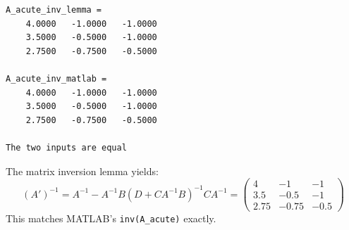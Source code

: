 \documentclass[12pt]{article}
\begin{document}
\begin{outputbox}
\begin{lstlisting}[style=output]
A_acute_inv_lemma =
    4.0000   -1.0000   -1.0000
    3.5000   -0.5000   -1.0000
    2.7500   -0.7500   -0.5000

A_acute_inv_matlab =
    4.0000   -1.0000   -1.0000
    3.5000   -0.5000   -1.0000
    2.7500   -0.7500   -0.5000

The two inputs are equal
\end{lstlisting}
\end{outputbox}

\begin{resultsbox}
The matrix inversion lemma yields:
\[
(A')^{-1} = A^{-1} - A^{-1}B(D + CA^{-1}B)^{-1}CA^{-1} = \begin{pmatrix} 4 & -1 & -1 \\ 3.5 & -0.5 & -1 \\ 2.75 & -0.75 & -0.5 \end{pmatrix}
\]
This matches MATLAB's \texttt{inv(A\_acute)} exactly. \quad \checkmark
\end{resultsbox}

\end{document}
